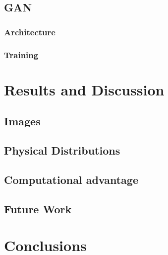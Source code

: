 \documentclass{report}
\begin{document}
\section{GAN}

\subsection{Architecture}

\subsection{Training}

\chapter{Results and Discussion}
\label{sec:results}
\section{Images}

\section{Physical Distributions}

\section{Computational advantage}

\section{Future Work}

\chapter{Conclusions}
\label{sec:conclusions}
\printbibliography

\begin{appendices}

\end{appendices}
\end{document}
